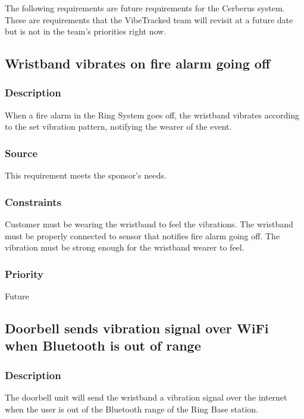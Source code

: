 The following requirements are future requirements for the Cerberus system. These are requirements that the VibeTracked team will revisit at a future date but is not in the team's priorities right now. 

\subsection{Wristband vibrates on fire alarm going off}
\subsubsection{Description}
When a fire alarm in the Ring System goes off, the wristband vibrates according to the set vibration pattern, notifying the wearer of the event.
\subsubsection{Source}
This requirement meets the sponsor's needs.
\subsubsection{Constraints}
Customer must be wearing the wristband to feel the vibrations.
The wristband must be properly connected to sensor that notifies fire alarm going off.
The vibration must be strong enough for the wristband wearer to feel.
\subsubsection{Priority}
Future

\subsection{Doorbell sends vibration signal over WiFi when Bluetooth is out of range}
\subsubsection{Description}
The doorbell unit will send the wristband a vibration signal over the internet when the user is out of the Bluetooth range of the Ring Base station. 
